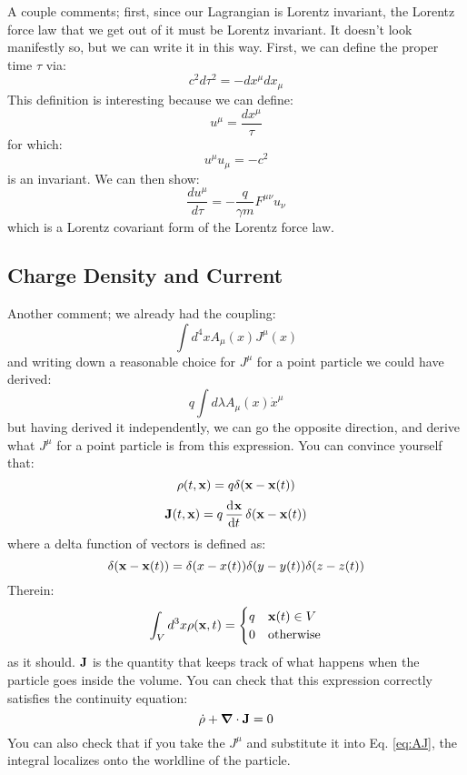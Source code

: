 A couple comments; first, since our Lagrangian is Lorentz invariant, the Lorentz force law that we get out of it must be Lorentz invariant. It doesn't look manifestly so, but we can write it in this way. First, we can define the proper time $\tau$ via:
\begin{equation}
    c^2 d\tau^2 = -dx^\mu dx_\mu
\end{equation}
This definition is interesting because we can define:
\begin{equation}
    u^\mu = \frac{dx^\mu}{\tau}
\end{equation}
for which:
\begin{equation}
    u^\mu u_\mu = -c^2
\end{equation}
is an invariant. We can then show:
\begin{equation}
    \frac{du^\mu}{d\tau} = -\frac{q}{\gamma m}F^{\mu\nu}u_\nu
\end{equation}
which is a Lorentz covariant form of the Lorentz force law.

\subsection{Charge Density and Current}
Another comment; we already had the coupling:
\begin{equation}\label{eq:AJ}
    \int d^4x A_\mu(x)J^\mu(x)
\end{equation}
and writing down a reasonable choice for $J^\mu$ for a point particle we could have derived:
\begin{equation}
    q\int d\lambda A_\mu(x)\dot{x}^\mu
\end{equation}
but having derived it independently, we can go the opposite direction, and derive what $J^\mu$ for a point particle is from this expression. You can convince yourself that:
\begin{equation}
    \rho(t, \mathbf{x}) = q\delta(\mathbf{x} - \mathbf{x}(t))
\end{equation}
\begin{equation}
    \v{J}(t, \v{x}) = q\dod{\v{x}}{t}\delta(\v{x} -\v{x}(t))
\end{equation}
where a delta function of vectors is defined as:
\begin{equation}
    \delta(\mathbf{x} - \mathbf{x}(t)) = \delta(x - x(t))\delta(y - y(t))\delta(z - z(t))
\end{equation}
Therein:
\begin{equation}
    \int_V d^3x\rho(\mathbf{x}, t) = \begin{cases}
        q & \mathbf{x}(t) \in V
        \\ 0 & \text{otherwise}
    \end{cases}
\end{equation}
as it should. $\mathbf{J}$ is the quantity that keeps track of what happens when the particle goes inside the volume. You can check that this expression correctly satisfies the continuity equation:
\begin{equation}
    \dot{\rho} + \nabla \cdot \v{J} = 0
\end{equation}
You can also check that if you take the $J^\mu$ and substitute it into Eq. \eqref{eq:AJ}, the integral localizes onto the worldline of the particle. 

